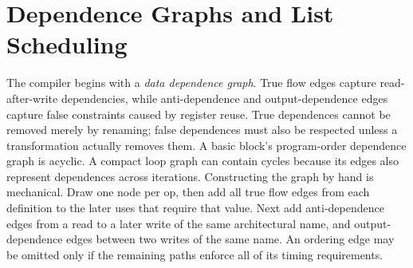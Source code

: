 \section{Dependence Graphs and List Scheduling}\label{sec:ilp-vliw-list-scheduling}
The compiler begins with a \textit{data dependence graph}.
True flow edges capture read-after-write dependencies, while anti-dependence and output-dependence edges capture false constraints caused by register reuse.
True dependences cannot be removed merely by renaming; false dependences must also be respected unless a transformation actually removes them.
A basic block's program-order dependence graph is acyclic.
A compact loop graph can contain cycles because its edges also represent dependences across iterations.
Constructing the graph by hand is mechanical.
Draw one node per op, then add all true flow edges from each definition to the later uses that require that value.
Next add anti-dependence edges from a read to a later write of the same architectural name, and output-dependence edges between two writes of the same name.
An ordering edge may be omitted only if the remaining paths enforce all of its timing requirements.

